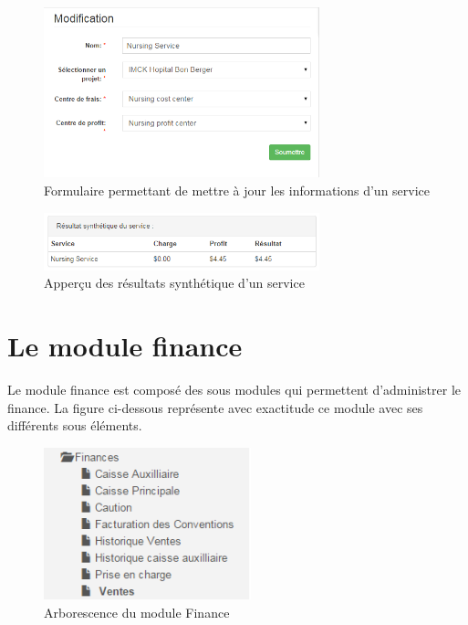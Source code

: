 \documentclass[12pt,a4paper]{report}
\begin{document}
\begin{figure}[h]
\begin{center}
\includegraphics[width=8cm]{pic/UpdateService.png}
\end{center}
\caption{Formulaire permettant de mettre à jour les informations d'un service}
\label{Formulaire permettant de mettre à jour les informations d'un service}
\end{figure} 

\begin{figure}[h]
\begin{center}
\includegraphics[width=8cm]{pic/SynthetiqueService.png}
\end{center}
\caption{Apperçu des résultats synthétique d'un service}
\label{Apperçu des résultats synthétique d'un service}
\end{figure} 


\newpage

\newpage
\chapter{Le module finance}        
Le module finance est composé des sous modules qui permettent d'administrer le finance. La figure ci-dessous représente avec exactitude ce module avec ses différents sous éléments.

\begin{figure}[h]
\begin{center}
\includegraphics[width=6cm]{pic/FinanceArbo.png}
\end{center}
\caption{Arborescence du module Finance}
\label{Arborescence du module Finance}
\end{figure}
\end{document}
